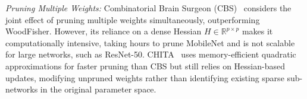 \textit{Pruning Multiple Weights:} 
Combinatorial Brain Surgeon (CBS)~\cite{CBS} considers the joint effect of pruning multiple weights simultaneously, outperforming WoodFisher. However, its reliance on a dense Hessian $H \in \mathbb{R}^{p \times p}$ makes it computationally intensive, taking hours to prune MobileNet and is not scalable for large networks, such as ResNet-50.
CHITA~\cite{CHITA} uses memory-efficient quadratic approximations for faster pruning than CBS but still relies on Hessian-based updates, modifying unpruned weights rather than identifying existing sparse sub-networks in the original parameter space.


